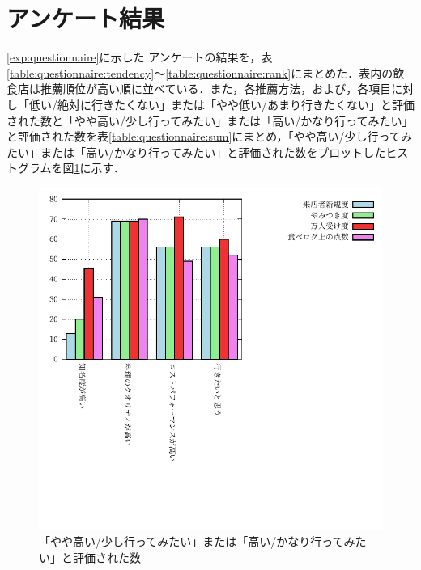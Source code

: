 	\section{アンケート結果}
	\ref{exp:questionnaire}に示した
	アンケートの結果を，表\ref{table:questionnaire:tendency}〜\ref{table:questionnaire:rank}にまとめた．表内の飲食店は推薦順位が高い順に並べている．また，各推薦方法，および，各項目に対し「低い/絶対に行きたくない」または「やや低い/あまり行きたくない」と評価された数と「やや高い/少し行ってみたい」または「高い/かなり行ってみたい」と評価された数を表\ref{table:questionnaire:sum}にまとめ，「やや高い/少し行ってみたい」または「高い/かなり行ってみたい」と評価された数をプロットしたヒストグラムを図\ref{fig:sum}に示す．
	
	
	
	
	
	
	
	\begin{figure}[H]
		\centering
		\includegraphics[width=\linewidth]{./figure/sum.pdf}
		\caption{「やや高い/少し行ってみたい」または「高い/かなり行ってみたい」と評価された数\label{fig:sum}}
	\end{figure}
